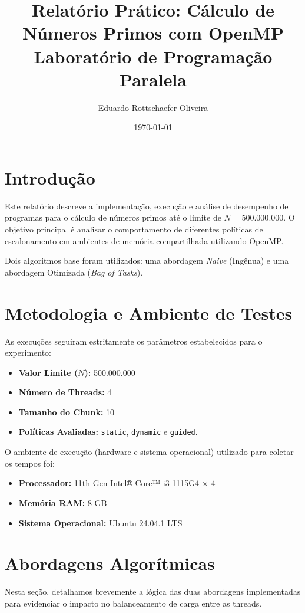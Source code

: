 \documentclass[12pt, a4paper]{article}
\title{\textbf{Relatório Prático: Cálculo de Números Primos com OpenMP}\\
\large Laboratório de Programação Paralela}
\author{
    Eduardo Rottschaefer Oliveira\\
}
\date{\today}
\begin{document}
\maketitle

\tableofcontents
\newpage

\section{Introdução}
Este relatório descreve a implementação, execução e análise de desempenho de programas para o cálculo de números primos até o limite de $N = 500.000.000$. O objetivo principal é analisar o comportamento de diferentes políticas de escalonamento em ambientes de memória compartilhada utilizando OpenMP.

Dois algoritmos base foram utilizados: uma abordagem \textit{Naive} (Ingênua) e uma abordagem Otimizada (\textit{Bag of Tasks}).

\section{Metodologia e Ambiente de Testes}
As execuções seguiram estritamente os parâmetros estabelecidos para o experimento:
\begin{itemize}
    \item \textbf{Valor Limite ($N$):} 500.000.000
    \item \textbf{Número de Threads:} 4
    \item \textbf{Tamanho do Chunk:} 10
    \item \textbf{Políticas Avaliadas:} \texttt{static}, \texttt{dynamic} e \texttt{guided}.
\end{itemize}

O ambiente de execução (hardware e sistema operacional) utilizado para coletar os tempos foi:
\begin{itemize}
    \item \textbf{Processador:} 11th Gen Intel® Core™ i3-1115G4 × 4
    \item \textbf{Memória RAM:} 8 GB
    \item \textbf{Sistema Operacional:} Ubuntu 24.04.1 LTS
\end{itemize}

\section{Abordagens Algorítmicas}
Nesta seção, detalhamos brevemente a lógica das duas abordagens implementadas para evidenciar o impacto no balanceamento de carga entre as threads.
\end{document}
